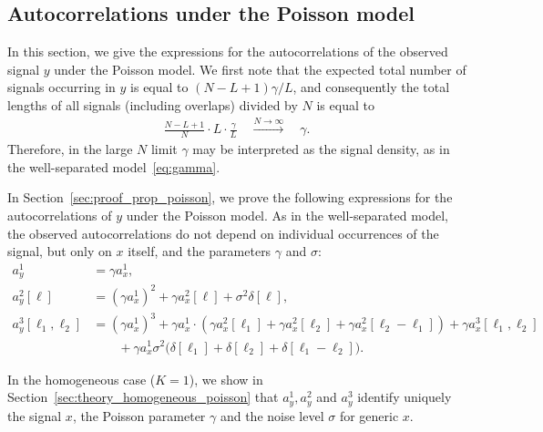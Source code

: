 \documentclass[12pt]{article}
\newcommand{\1}{\mathbf{1}}
\newcommand{\Poisson}{\text{Poisson}}
\theoremstyle{plain}
\theoremstyle{definition}
\theoremstyle{remark}
\theoremstyle{plain}
\theoremstyle{remark}
\theoremstyle{plain}
\theoremstyle{plain}
\theoremstyle{plain}
\numberwithin{equation}{section}
\begin{document}
\subsection{Autocorrelations under the Poisson model}

In this section, we give the expressions for the autocorrelations of the observed signal $y$ under the Poisson model. %
 We first note that the expected total number of signals occurring in $y$ is equal to $(N - L + 1)\gamma / L$, and consequently the total lengths of all signals (including overlaps) divided by $N$ is equal to
%
\begin{align}
\frac{N - L + 1}{N} \cdot L \cdot \frac{\gamma  }{L} 
\quad \overset{N\to\infty}{\longrightarrow} \quad \gamma.
\end{align}
%
Therefore, in the large $N$ limit $\gamma$ may be interpreted as the signal density, as in the well-separated model~\eqref{eq:gamma}.

In Section~\ref{sec:proof_prop_poisson}, we prove the following expressions for the autocorrelations of $y$ under the Poisson model. As in the well-separated model, the observed autocorrelations do not depend on individual occurrences of the signal, but only on $x$ itself, and the parameters $\gamma$ and $\sigma$:
%
\begin{align}
a_y^1  &=  \gamma a_{x}^1, 
\label{eq:mean_micrograph2} \\
a_y^2[\ell] &=  (\gamma a_x^1)^2 + \gamma a_x^2[\ell] + \sigma^2 \delta[\ell], 
\label{eq:ac2_micrograph2} \\
a_y^3[\ell_1,\ell_2]  & = (\gamma a_x^1)^3 + \gamma a_x^1  
\cdot ( \gamma a_x^2[\ell_1] + \gamma a_x^2[\ell_2]
+ \gamma a_x^2[\ell_2-\ell_1]) + \gamma a_x^3[\ell_1,\ell_2] 
\nonumber \\
& \qquad + \gamma a_x^1 \sigma^2 \big(\delta[\ell_1]+\delta[\ell_2] +\delta[\ell_1-\ell_2] \big).
\label{eq:ac3_micrograph2}
\end{align}

In the homogeneous case ($K=1$), we show in Section~\ref{sec:theory_homogeneous_poisson} that $a_y^1,a_y^2$ and $a_y^3$ identify uniquely the signal $x$, the Poisson parameter $\gamma$ and the noise level $\sigma$ for generic $x$. 
%
\end{document}
